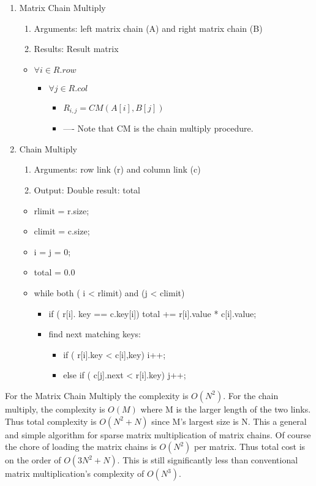 \begin{enumerate}
\item Matrix Chain Multiply
\begin{enumerate}
\item Arguments: left matrix chain (A) and right matrix chain (B)
\item Results: Result matrix
\end{enumerate}
\begin{itemize}
\item $\forall i \in R.row$
\begin{itemize}
\item $\forall j \in R.col$
\begin{itemize}
\item $R_{i,j} = CM( A[i], B[j]) $  
\item ---- Note that CM is the chain multiply procedure.  
\end{itemize}

\end{itemize}

\end{itemize}

\item Chain Multiply
\begin{enumerate}
	\item Arguments:  row link (r) and column link (c)
	\item Output:  Double result: total
	\end{enumerate}
	\begin{itemize}
		\item rlimit = r.size;
		\item climit = c.size;
		\item i = j = 0;
		\item total = 0.0
		\item while both ( i < rlimit) and (j < climit)
		\begin{itemize}
			\item if ( r[i]. key == c.key[i]) total += r[i].value * c[i].value;
			\item find next matching keys:
				\begin{itemize}
					\item if ( r[i].key < c[i],key) i++;
					\item else if ( c[j].next < r[i].key) j++;
				\end{itemize}
		\end{itemize}
	\end{itemize}
\end{enumerate}
					
For the Matrix Chain Multiply the complexity is $O(N^2)$.  For the chain multiply, the complexity is $O(M)$ where M is the larger length of the two links.  Thus total complexity is $O(N^2 + N)$ since M's largest size is N.  This a general and simple algorithm for sparse matrix multiplication of matrix chains.  Of course the chore of loading the matrix chains is $O(N^2)$ per matrix.  Thus total cost is on the order of $O(3N^2 +N)$.  This is still significantly less than conventional matrix multiplication's complexity of $O(N^3)$.
